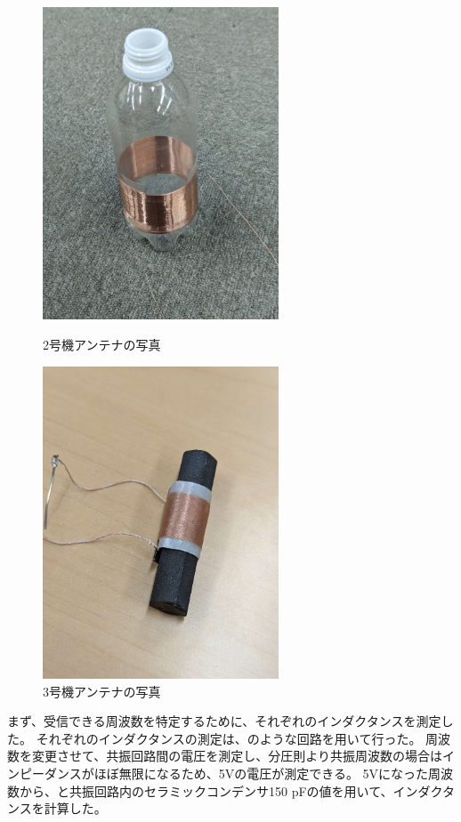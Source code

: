 \documentclass[report.tex]{subfiles}
\begin{document}
\begin{figure}[H]
	\begin{minipage}[b]{0.5\linewidth}
		\centering
		\includegraphics[width=7cm]{fig/2.jpg}
		\caption{2号機アンテナの写真}
		\label{fig:2}
	\end{minipage}
	\begin{minipage}[b]{0.5\linewidth}
		\centering
		\includegraphics[width=7cm]{fig/3.jpg}
		\caption{3号機アンテナの写真}
		\label{fig:3}
	\end{minipage}
\end{figure}

まず、受信できる周波数を特定するために、それぞれのインダクタンスを測定した。
それぞれのインダクタンスの測定は、のような回路を用いて行った。
周波数を変更させて、共振回路間の電圧を測定し、分圧則より共振周波数の場合はインピーダンスがほぼ無限になるため、5Vの電圧が測定できる。
5Vになった周波数から、と共振回路内のセラミックコンデンサ150 pFの値を用いて、インダクタンスを計算した。
\end{document}
